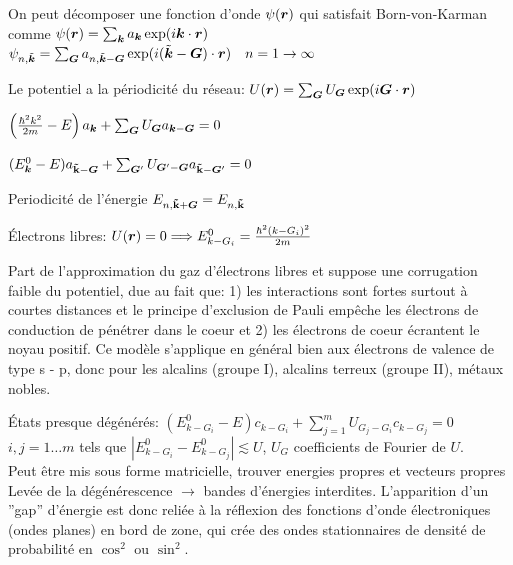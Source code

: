 \begin{squishlist}
    \item On peut décomposer une fonction d'onde $\psi(\bm{r})$ qui satisfait Born-von-Karman comme $\psi(\bm{r}) = \sum_{\bm{k}} a_{\bm{k}} \exp(i \bm{k} \cdot \bm{r})$
    \squishsep $\psi_{n,\tilde{\bm{k}}} = \sum_{\bm{G}} a_{n, \tilde{\bm{k}}-\bm{G}} \exp(i (\tilde{\bm{k}} - \bm{G}) \cdot \bm{r}) \quad n=1\rightarrow\infty$
    \item Le potentiel a la périodicité du réseau: $U(\bm{r}) = \sum_{\bm{G}} U_{\bm{G}} \exp(i \bm{G} \cdot \bm{r})$
    \item $\left(\frac{\hbar^2 k^2}{2m} - E\right)a_{\bm{k}} + \sum_{\bm{G}}U_{\bm{G}}a_{\bm{k} - \bm{G}}  = 0$
    \item $(E_{\bm{k}}^0 - E)a_{\mathbf{{\tilde{k}}} - \bm{G}} + \sum_{\bm{G}'}U_{\bm{G}' - \bm{G}}a_{\mathbf{\tilde{k}} - \bm{G}'}  = 0$
    \item Periodicité de l'énergie $ E_{n,\mathbf{\tilde{k}} + \bm{G}} = E_{n,\mathbf{\tilde{k}}}$
    \item Électrons libres: $U(\bm{r}) = 0 \Longrightarrow E_{k - G_i}^0 = \frac{\hbar^2(k - G_i)^2}{2m}$
\end{squishlist}

Part de l'approximation du gaz d'électrons libres et suppose une corrugation faible du potentiel, due au fait que: 
1) les interactions sont fortes surtout à courtes distances et le principe d'exclusion de Pauli empêche les électrons de conduction de pénétrer dans le coeur et 
2) les électrons de coeur écrantent le noyau positif. Ce modèle s'applique en général bien aux électrons de valence de type s - p, donc pour les alcalins (groupe I), alcalins terreux (groupe II), métaux nobles.
\begin{squishlist}
    \item États presque dégénérés: $(E_{k-G_i}^0 - E) c_{k-G_i} + \sum_{j=1}^m U_{G_j - G_i} c_{k-G_j} = 0$ \\
    $i,j = 1 \ldots m$ tels que $|E_{k-G_i}^0 - E_{k-G_j}^0| \lesssim U$, \quad $U_G$ coefficients de Fourier de $U$. \\
    Peut être mis sous forme matricielle, trouver energies propres et vecteurs propres \\
    Levée de la dégénérescence $\rightarrow$ bandes d'énergies interdites.
    L’apparition d’un ”gap” d’énergie est donc reliée à la réflexion des fonctions d’onde électroniques (ondes planes) en bord de zone, qui crée des ondes
    stationnaires de densité de probabilité en $\cos^2$ ou $\sin^2$.
\end{squishlist}

